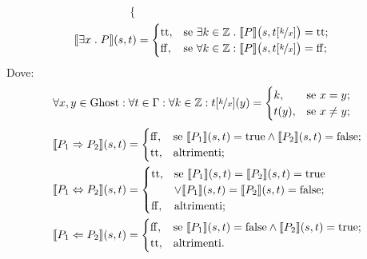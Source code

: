 \begin{definizione}
\begin{align*}
\begin{cases}
        \end{cases}\\
   \llbracket \exists x \mathrel{.} P\rrbracket(s,t)
      &=
        \begin{cases}
                \mathrm{tt},  &\text{se $\exists k \in \mathbb{Z} \mathrel{.} \llbracket P \rrbracket \bigl(s,t[\nicefrac{k}{x}] \bigr) = \mathrm{tt}$};\\
                \mathrm{ff},  &\text{se $\forall k \in \mathbb{Z} \mathrel{:} \llbracket P \rrbracket \bigl(s,t[\nicefrac{k}{x}] \bigr) = \mathrm{ff}$};
        \end{cases}
\end{align*}
Dove:
\begin{align*}
   \forall x,y\in\mathrm{Ghost}\mathrel{:}\forall t \in\Gamma\mathrel{:}\forall k\in\mathbb{Z} \mathrel{:} t[\nicefrac{k}{x}](y)
      &=
        \begin{cases}
                 k,   &\text{se $x = y$};\\
                 t(y),&\text{se $x  \neq  y$};
        \end{cases}
\end{align*}
\begin{align*}
    \llbracket P_1 \Rightarrow P_2 \rrbracket(s,t)
       &=
        \begin{cases}
            \mathrm{ff}, &\text{se $\llbracket P_1\rrbracket(s,t) = \mathrm{true} \land \llbracket P_2\rrbracket(s,t) = \mathrm{false}$};\\
            \mathrm{tt}, &\text{altrimenti};
        \end{cases}\\
    \llbracket P_1 \Leftrightarrow P_2\rrbracket(s,t)
       &=
        \begin{cases}
            \mathrm{tt},&\text{se $\llbracket P_1\rrbracket(s,t) = \llbracket P_2\rrbracket(s,t) = \mathrm{true}$}\\
                 &\text{$\lor\llbracket P_1\rrbracket(s,t) = \llbracket P_2 \rrbracket(s,t) = \mathrm{false}$};\\
            \mathrm{ff}, &\text{altrimenti};
        \end{cases}\\
   \llbracket P_1 \Leftarrow P_2\rrbracket(s,t)
      &=
        \begin{cases}
            \mathrm{ff},&\text{se $\llbracket P_1\rrbracket(s,t) = \mathrm{false} \land \llbracket P_2\rrbracket(s,t) = \mathrm{true}$};\\
            \mathrm{tt},&\text{altrimenti}.
   \end{cases}
\end{align*}
\end{definizione}


